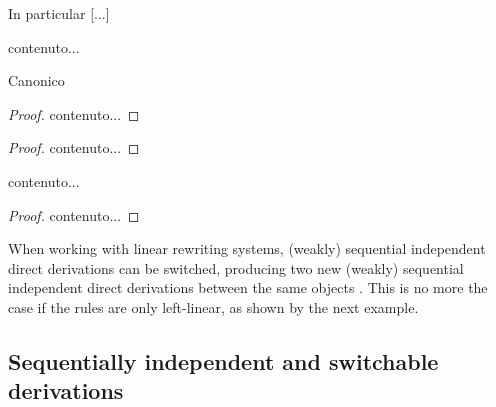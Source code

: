 In particular [...]
\begin{definition}
	contenuto...
\end{definition}
\begin{remark}
Canonico
\end{remark}
\begin{corollary}
\end{corollary}
\begin{proof}
	contenuto...
\end{proof}

\begin{lemma}
\end{lemma}
\begin{proof}
	contenuto...
\end{proof}


\begin{lemma}\label{lem:swfill}
\end{lemma}
\begin{remark}
\end{remark}
\begin{remark}
	contenuto...
\end{remark}
\begin{proof}
	contenuto...
\end{proof}




When working with linear rewriting systems, (weakly) sequential independent direct derivations can be switched, producing two new (weakly) sequential independent direct derivations between the same objects \cite[Thm.~$7.7$]{lack2005adhesive} . This is no more the case if the rules are only left-linear, as shown by the next example.

\begin{example}\label{ex:difficile}
\end{example}



\subsection{Sequentially independent and switchable derivations}


